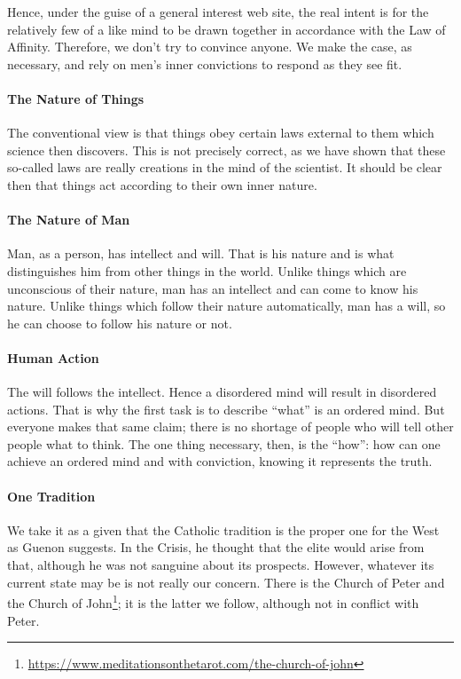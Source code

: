 Hence, under the guise of a general interest web site, the real intent is for the relatively few of a like mind to be drawn together in accordance with the Law of Affinity. Therefore, we don't try to convince anyone. We make the case, as necessary, and rely on men's inner convictions to respond as they see fit.

\paragraph{The Nature of Things}


The conventional view is that things obey certain laws external to them which science then discovers. This is not precisely correct, as we have shown that these so-called laws are really creations in the mind of the scientist. It should be clear then that things act according to their own inner nature.

\paragraph{The Nature of Man}


Man, as a person, has intellect and will. That is his nature and is what distinguishes him from other things in the world. Unlike things which are unconscious of their nature, man has an intellect and can come to know his nature. Unlike things which follow their nature automatically, man has a will, so he can choose to follow his nature or not.

\paragraph{Human Action}


The will follows the intellect. Hence a disordered mind will result in disordered actions. That is why the first task is to describe ``what'' is an ordered mind. But everyone makes that same claim; there is no shortage of people who will tell other people what to think. The one thing necessary, then, is the ``how'': how can one achieve an ordered mind and with conviction, knowing it represents the truth.

\paragraph{One Tradition}


We take it as a given that the Catholic tradition is the proper one for the West as Guenon suggests. In the Crisis, he thought that the elite would arise from that, although he was not sanguine about its prospects. However, whatever its current state may be is not really our concern. There is the Church of Peter and the Church of John\footnote{\url{https://www.meditationsonthetarot.com/the-church-of-john}}; it is the latter we follow, although not in conflict with Peter.

